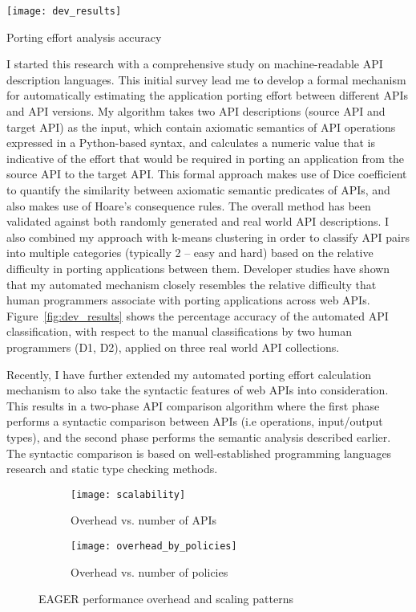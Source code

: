 \begin{floatingfigure}{2.8in}
\vspace{-0.1in}
\texttt{[image: dev\_results]}
\vspace{-0.08in}
\caption{Porting effort analysis accuracy\label{fig:dev_results}}
\end{floatingfigure}

I started this research with a comprehensive study on machine-readable 
API description languages. This initial survey lead me to develop a formal 
mechanism for automatically estimating the application porting effort between 
different APIs and API versions. My algorithm takes two API descriptions 
(source API and target API) as the input, which contain axiomatic semantics of 
API operations expressed in a Python-based syntax, and calculates a numeric 
value that is indicative of the effort that would be required in porting an application 
from the source API to the target API. This formal approach makes use of Dice 
coefficient to quantify the similarity between axiomatic semantic predicates of APIs, 
and also makes use of Hoare's consequence rules. The overall method has been 
validated against both randomly generated and real world API descriptions. 
I also combined my approach with k-means clustering in order to classify API pairs into 
multiple categories (typically 2 -- easy and hard) based on the relative difficulty in 
porting applications between them. Developer studies have shown that my 
automated mechanism closely resembles the relative difficulty 
that human programmers associate with porting applications across web APIs.
Figure~\ref{fig:dev_results} shows the percentage accuracy of the automated API
classification, with respect to the manual classifications by two human programmers
(D1, D2), applied on three real world API collections.

Recently, I have further extended my automated porting effort calculation 
mechanism to also take the syntactic features of web APIs into consideration. This 
results in a two-phase API comparison algorithm where the first phase performs a 
syntactic comparison between APIs (i.e operations, input/output types), and the 
second phase performs the semantic analysis described earlier. The syntactic 
comparison is based on well-established programming languages research and 
static type checking methods.

\begin{figure}
\centering
\begin{subfigure}{.5\textwidth}
  \centering
  \texttt{[image: scalability]}
  \caption{Overhead vs. number of APIs}
  \label{fig:sub1}
\end{subfigure}%
\begin{subfigure}{.5\textwidth}
  \centering
  \texttt{[image: overhead\_by\_policies]}
  \caption{Overhead vs. number of policies}
  \label{fig:sub2}
\end{subfigure}
\caption{EAGER performance overhead and scaling patterns}
\label{fig:eager_perf}
\end{figure}

